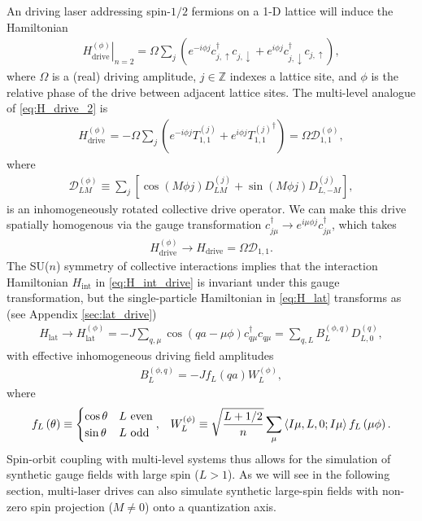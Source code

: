 \documentclass[nofootinbib,notitlepage,11pt]{revtex4-2}
\renewcommand{\t}{\text} %
\newcommand{\f}[2]{\dfrac{#1}{#2}} %
\newcommand{\p}[1]{\left(#1\right)} %
\renewcommand{\sp}[1]{\left[#1\right]} %
\newcommand{\bk}{\Braket} %
\newcommand{\1}{\mathds{1}}
\newcommand{\up}{\uparrow}
\newcommand{\dn}{\downarrow}
\newcommand{\D}{\mathcal{D}}
\begin{document}
An driving laser addressing spin-$1/2$ fermions on a 1-D lattice will
induce the Hamiltonian
\begin{align}
  \left. H_{\t{drive}}^{(\phi)} \right|_{n=2}
  = \Omega \sum_j
  \p{e^{-i\phi j} c_{j,\up}^\dag c_{j,\dn}
    + e^{i\phi j} c_{j,\dn}^\dag c_{j,\up}},
  \label{eq:H_drive_2}
\end{align}
where $\Omega$ is a (real) driving amplitude, $j\in\mathbb{Z}$ indexes
a lattice site, and $\phi$ is the relative phase of the drive between
adjacent lattice sites.  The multi-level analogue of
\eqref{eq:H_drive_2} is
\begin{align}
  H_{\t{drive}}^{(\phi)}
  = -\Omega \sum_j \p{e^{-i\phi j} T_{1,1}^{(j)}
    + e^{i\phi j} {T_{1,1}^{(j)}}^\dag}
  = \Omega \D_{1,1}^{(\phi)},
  \label{eq:H_drive}
\end{align}
where
\begin{align}
  \D_{LM}^{(\phi)}
  \equiv \sum_j \sp{\cos\p{M\phi j} D_{LM}^{(j)}
    + \sin\p{M\phi j} D_{L,-M}^{(j)}},
  \label{eq:drive_rot}
\end{align}
is an inhomogeneously rotated collective drive operator.  We can make
this drive spatially homogenous via the gauge transformation
$c_{j\mu}^\dag \to e^{i\mu\phi j} c_{j\mu}^\dag$, which takes
\begin{align}
  H_{\t{drive}}^{(\phi)} \to H_{\t{drive}} = \Omega \D_{1,1}.
\end{align}
The SU($n$) symmetry of collective interactions implies that the
interaction Hamiltonian $H_{\t{int}}$ in \eqref{eq:H_int_drive} is
invariant under this gauge transformation, but the single-particle
Hamiltonian in \eqref{eq:H_lat} transforms as (see Appendix
\ref{sec:lat_drive})
\begin{align}
  H_{\t{lat}}
  \to H_{\t{lat}}^{(\phi)}
  = -J \sum_{q,\mu} \cos\p{qa-\mu\phi} c_{q\mu}^\dag c_{q\mu}
  = \sum_{q,L} B_L^{(\phi,q)} D_{L,0}^{(q)},
  \label{eq:H_lat_SOC}
\end{align}
with effective inhomogeneous driving field amplitudes
\begin{align}
  B_L^{(\phi,q)} = -J f_L\p{qa} W_L^{(\phi)},
\end{align}
where
\begin{align}
  f_L\p{\theta} \equiv
  \begin{cases}
    \cos\theta & L~\t{even} \\
    \sin\theta & L~\t{odd}
  \end{cases},
  &&
  W_L^{(\phi)} \equiv \sqrt{\f{L+1/2}{n}}
  \sum_\mu \bk{I\mu,L,0;I\mu} f_L\p{\mu\phi}.
\end{align}
Spin-orbit coupling with multi-level systems thus allows for the
simulation of synthetic gauge fields with large spin ($L>1$).  As we
will see in the following section, multi-laser drives can also
simulate synthetic large-spin fields with non-zero spin projection
($M\ne0$) onto a quantization axis.
\end{document}
